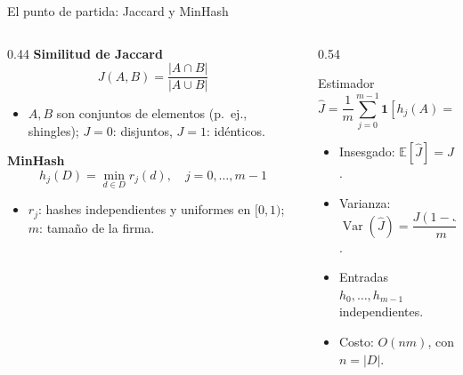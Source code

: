 \documentclass[aspectratio=169,11pt]{beamer}
\begin{document}
\begin{frame}{El punto de partida: Jaccard y MinHash}
  \small
  \begin{columns}[T]
    \begin{column}{0.44\textwidth}
      \textbf{Similitud de Jaccard}
      \[
        J(A,B)=\frac{|A\cap B|}{|A\cup B|}
      \]
      \begin{itemize}
        \item $A,B$ son conjuntos de elementos (p.\ ej., shingles);
              $J=0$: disjuntos, $J=1$: id\'enticos.
      \end{itemize}
      \vspace{0.2em}
      \textbf{MinHash}
      \[
        h_j(D)=\min_{d\in D} r_j(d),\quad j=0,\ldots,m-1
      \]
      \begin{itemize}
        \item $r_j$: hashes independientes y uniformes en $[0,1)$;
              $m$: tama\~no de la firma.
      \end{itemize}
    \end{column}
    \begin{column}{0.54\textwidth}
      \begin{block}{Estimador}
        \[
          \widehat J=\frac1m\sum_{j=0}^{m-1}\mathbf 1[h_j(A)=h_j(B)]
        \]
      \end{block}
      \begin{itemize}
        \item Insesgado: $\mathbb E[\widehat J]=J$.
        \item Varianza: $\operatorname{Var}(\widehat J)=\dfrac{J(1-J)}{m}$.
        \item Entradas $h_0,\ldots,h_{m-1}$ independientes.
        \item Costo: $O(nm)$, con $n=|D|$.
      \end{itemize}
    \end{column}
  \end{columns}
\end{frame}
\end{document}
